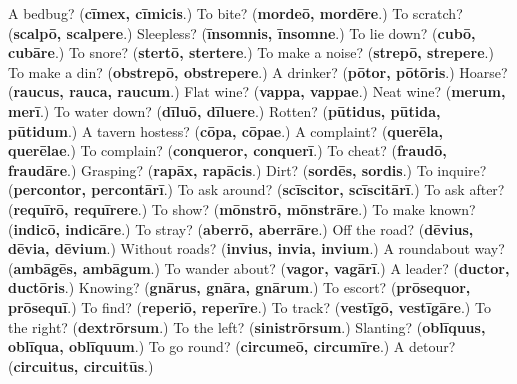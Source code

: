\begin{tcolorbox}[breakable,colback=teal!4,colframe=teal!35!black,title={Before you move on}]
A bedbug? (\textbf{cīmex, cīmicis}.) To bite? (\textbf{mordeō, mordēre}.) To scratch? (\textbf{scalpō, scalpere}.) Sleepless? (\textbf{īnsomnis, īnsomne}.) To lie down? (\textbf{cubō, cubāre}.) To snore? (\textbf{stertō, stertere}.) To make a noise? (\textbf{strepō, strepere}.) To make a din? (\textbf{obstrepō, obstrepere}.) A drinker? (\textbf{pōtor, pōtōris}.) Hoarse? (\textbf{raucus, rauca, raucum}.) Flat wine? (\textbf{vappa, vappae}.) Neat wine? (\textbf{merum, merī}.) To water down? (\textbf{dīluō, dīluere}.) Rotten? (\textbf{pūtidus, pūtida, pūtidum}.) A tavern hostess? (\textbf{cōpa, cōpae}.) A complaint? (\textbf{querēla, querēlae}.) To complain? (\textbf{conqueror, conquerī}.) To cheat? (\textbf{fraudō, fraudāre}.) Grasping? (\textbf{rapāx, rapācis}.) Dirt? (\textbf{sordēs, sordis}.) To inquire? (\textbf{percontor, percontārī}.) To ask around? (\textbf{scīscitor, scīscitārī}.) To ask after? (\textbf{requīrō, requīrere}.) To show? (\textbf{mōnstrō, mōnstrāre}.) To make known? (\textbf{indicō, indicāre}.) To stray? (\textbf{aberrō, aberrāre}.) Off the road? (\textbf{dēvius, dēvia, dēvium}.) Without roads? (\textbf{invius, invia, invium}.) A roundabout way? (\textbf{ambāgēs, ambāgum}.) To wander about? (\textbf{vagor, vagārī}.) A leader? (\textbf{ductor, ductōris}.) Knowing? (\textbf{gnārus, gnāra, gnārum}.) To escort? (\textbf{prōsequor, prōsequī}.) To find? (\textbf{reperiō, reperīre}.) To track? (\textbf{vestīgō, vestīgāre}.) To the right? (\textbf{dextrōrsum}.) To the left? (\textbf{sinistrōrsum}.) Slanting? (\textbf{oblīquus, oblīqua, oblīquum}.) To go round? (\textbf{circumeō, circumīre}.) A detour? (\textbf{circuitus, circuitūs}.)
\end{tcolorbox}
